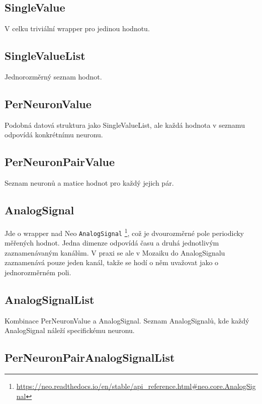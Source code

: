 \subsection{SingleValue}

V celku triviální wrapper pro jedinou hodnotu.

\subsection{SingleValueList}

Jednorozměrný seznam hodnot.

\subsection{PerNeuronValue}

Podobná datová struktura jako SingleValueList, ale každá hodnota v seznamu odpovídá konkrétnímu neuronu.

\subsection{PerNeuronPairValue}

Seznam neuronů a matice hodnot pro každý jejich pár.

\subsection{AnalogSignal}

Jde o wrapper nad Neo \lstinline|AnalogSignal| \footnote{\url{https://neo.readthedocs.io/en/stable/api_reference.html\#neo.core.AnalogSignal}}, což je dvourozměrné pole periodicky měřených hodnot. Jedna dimenze odpovídá času a druhá jednotlivým zaznamenávaným kanálům. V praxi se ale v Mozaiku do AnalogSignalu zaznamenává pouze jeden kanál, takže se hodí o něm uvažovat jako o jednorozměrném poli.

\subsection{AnalogSignalList}

Kombinace PerNeuronValue a AnalogSignal. Seznam AnalogSignalů, kde každý AnalogSignal náleží specifickému neuronu.

\subsection{PerNeuronPairAnalogSignalList}

